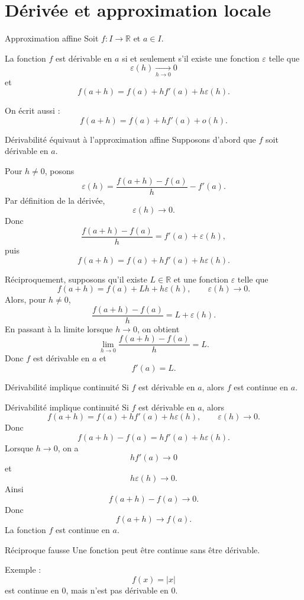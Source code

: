 \documentclass[11pt,a4paper]{article}
\newcommand{\R}{\mathbb{R}}
\begin{document}
\section{Dérivée et approximation locale}

\begin{theorembox}{Approximation affine}
Soit $f:I\to\R$ et $a\in I$.

La fonction $f$ est dérivable en $a$ si et seulement s'il existe une fonction $\varepsilon$ telle que
\[
\varepsilon(h)\xrightarrow[h\to0]{}0
\]
et
\[
f(a+h)=f(a)+hf'(a)+h\varepsilon(h).
\]

On écrit aussi :
\[
f(a+h)=f(a)+hf'(a)+o(h).
\]
\end{theorembox}

\begin{proofbox}{Dérivabilité équivaut à l'approximation affine}
Supposons d'abord que $f$ soit dérivable en $a$.

Pour $h\neq0$, posons
\[
\varepsilon(h)=\frac{f(a+h)-f(a)}{h}-f'(a).
\]
Par définition de la dérivée,
\[
\varepsilon(h)\to0.
\]
Donc
\[
\frac{f(a+h)-f(a)}{h}=f'(a)+\varepsilon(h),
\]
puis
\[
f(a+h)=f(a)+hf'(a)+h\varepsilon(h).
\]

Réciproquement, supposons qu'il existe $L\in\R$ et une fonction $\varepsilon$ telle que
\[
f(a+h)=f(a)+Lh+h\varepsilon(h),
\qquad \varepsilon(h)\to0.
\]
Alors, pour $h\neq0$,
\[
\frac{f(a+h)-f(a)}{h}=L+\varepsilon(h).
\]
En passant à la limite lorsque $h\to0$, on obtient
\[
\lim_{h\to0}\frac{f(a+h)-f(a)}{h}=L.
\]
Donc $f$ est dérivable en $a$ et
\[
f'(a)=L.
\]
\end{proofbox}

\begin{theorembox}{Dérivabilité implique continuité}
Si $f$ est dérivable en $a$, alors $f$ est continue en $a$.
\end{theorembox}

\begin{proofbox}{Dérivabilité implique continuité}
Si $f$ est dérivable en $a$, alors
\[
f(a+h)=f(a)+hf'(a)+h\varepsilon(h),
\qquad \varepsilon(h)\to0.
\]
Donc
\[
f(a+h)-f(a)=hf'(a)+h\varepsilon(h).
\]
Lorsque $h\to0$, on a
\[
hf'(a)\to0
\]
et
\[
h\varepsilon(h)\to0.
\]
Ainsi
\[
f(a+h)-f(a)\to0.
\]
Donc
\[
f(a+h)\to f(a).
\]
La fonction $f$ est continue en $a$.
\end{proofbox}

\begin{warningbox}{Réciproque fausse}
Une fonction peut être continue sans être dérivable.

Exemple :
\[
f(x)=|x|
\]
est continue en $0$, mais n'est pas dérivable en $0$.
\end{warningbox}
\end{document}

